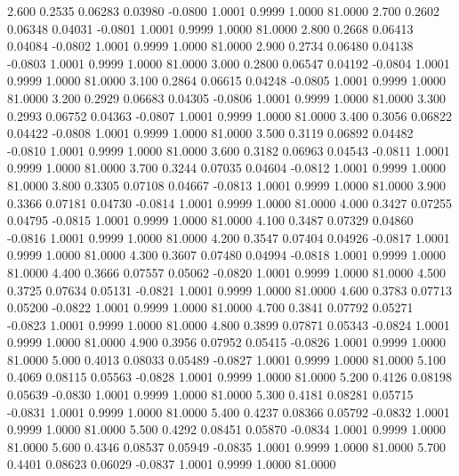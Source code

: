    2.600   0.2535   0.06283   0.03980  -0.0800   1.0001   0.9999   1.0000  81.0000
   2.700   0.2602   0.06348   0.04031  -0.0801   1.0001   0.9999   1.0000  81.0000
   2.800   0.2668   0.06413   0.04084  -0.0802   1.0001   0.9999   1.0000  81.0000
   2.900   0.2734   0.06480   0.04138  -0.0803   1.0001   0.9999   1.0000  81.0000
   3.000   0.2800   0.06547   0.04192  -0.0804   1.0001   0.9999   1.0000  81.0000
   3.100   0.2864   0.06615   0.04248  -0.0805   1.0001   0.9999   1.0000  81.0000
   3.200   0.2929   0.06683   0.04305  -0.0806   1.0001   0.9999   1.0000  81.0000
   3.300   0.2993   0.06752   0.04363  -0.0807   1.0001   0.9999   1.0000  81.0000
   3.400   0.3056   0.06822   0.04422  -0.0808   1.0001   0.9999   1.0000  81.0000
   3.500   0.3119   0.06892   0.04482  -0.0810   1.0001   0.9999   1.0000  81.0000
   3.600   0.3182   0.06963   0.04543  -0.0811   1.0001   0.9999   1.0000  81.0000
   3.700   0.3244   0.07035   0.04604  -0.0812   1.0001   0.9999   1.0000  81.0000
   3.800   0.3305   0.07108   0.04667  -0.0813   1.0001   0.9999   1.0000  81.0000
   3.900   0.3366   0.07181   0.04730  -0.0814   1.0001   0.9999   1.0000  81.0000
   4.000   0.3427   0.07255   0.04795  -0.0815   1.0001   0.9999   1.0000  81.0000
   4.100   0.3487   0.07329   0.04860  -0.0816   1.0001   0.9999   1.0000  81.0000
   4.200   0.3547   0.07404   0.04926  -0.0817   1.0001   0.9999   1.0000  81.0000
   4.300   0.3607   0.07480   0.04994  -0.0818   1.0001   0.9999   1.0000  81.0000
   4.400   0.3666   0.07557   0.05062  -0.0820   1.0001   0.9999   1.0000  81.0000
   4.500   0.3725   0.07634   0.05131  -0.0821   1.0001   0.9999   1.0000  81.0000
   4.600   0.3783   0.07713   0.05200  -0.0822   1.0001   0.9999   1.0000  81.0000
   4.700   0.3841   0.07792   0.05271  -0.0823   1.0001   0.9999   1.0000  81.0000
   4.800   0.3899   0.07871   0.05343  -0.0824   1.0001   0.9999   1.0000  81.0000
   4.900   0.3956   0.07952   0.05415  -0.0826   1.0001   0.9999   1.0000  81.0000
   5.000   0.4013   0.08033   0.05489  -0.0827   1.0001   0.9999   1.0000  81.0000
   5.100   0.4069   0.08115   0.05563  -0.0828   1.0001   0.9999   1.0000  81.0000
   5.200   0.4126   0.08198   0.05639  -0.0830   1.0001   0.9999   1.0000  81.0000
   5.300   0.4181   0.08281   0.05715  -0.0831   1.0001   0.9999   1.0000  81.0000
   5.400   0.4237   0.08366   0.05792  -0.0832   1.0001   0.9999   1.0000  81.0000
   5.500   0.4292   0.08451   0.05870  -0.0834   1.0001   0.9999   1.0000  81.0000
   5.600   0.4346   0.08537   0.05949  -0.0835   1.0001   0.9999   1.0000  81.0000
   5.700   0.4401   0.08623   0.06029  -0.0837   1.0001   0.9999   1.0000  81.0000

